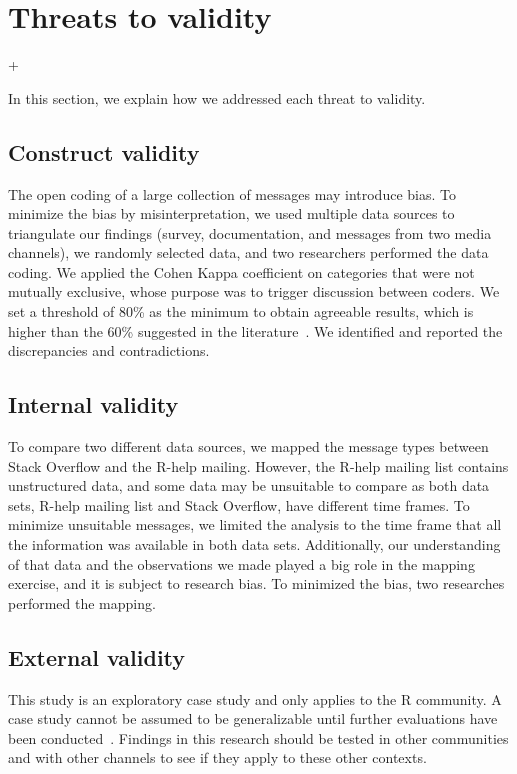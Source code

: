 \section{Threats to validity}+
\label{cha:threats}

    In this section, we explain how we addressed each threat to
    validity.

\subsection{Construct validity}

    The open coding of a large collection of messages may introduce bias.
    To minimize the bias by misinterpretation, we used multiple data sources to triangulate our findings (survey, documentation, and messages from two media channels), we randomly selected data, and two researchers performed the data coding.
    We applied the Cohen Kappa coefficient on categories that were not mutually exclusive, whose purpose  was to trigger discussion between coders.
    We set a threshold of 80\% as the minimum to obtain agreeable results, which is higher than the 60\% suggested in the literature~\cite{Landis1977}.
    We identified and reported the discrepancies and contradictions.

\subsection{Internal validity}

    To compare two different data sources, we mapped the message types between Stack Overflow and the R-help mailing.
    However, the R-help mailing list contains unstructured data, and some data may be unsuitable to compare as both data sets, R-help mailing list and Stack Overflow, have different time frames.
    To minimize unsuitable messages, we limited the analysis to the time frame that all the information was available in both data sets.
    Additionally, our understanding of that data and the observations we made played a big role in the mapping exercise, and it is subject to research bias.
    To minimized the bias, two researches performed the mapping.

\subsection{External validity}

    This study is an exploratory case study and only applies to the R community.
    A case study cannot be assumed to be generalizable until further evaluations have been conducted~\cite{Yin2009}.
    Findings in this research should be tested in other communities and with other channels to see if they apply to these other contexts.


